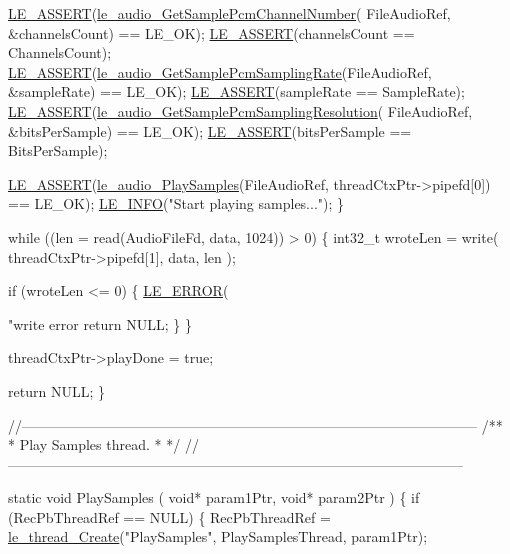 \begin{DoxyCodeInclude}
{{{{{{{{        \hyperlink{le__log_8h_ac0dbbef91dc0fed449d0092ff0557b39}{LE\_ASSERT}(\hyperlink{le__audio__interface_8h_a40bf3633c3050a7526a100562edc97f9}{le\_audio\_GetSamplePcmChannelNumber}(
      FileAudioRef, &channelsCount) == LE\_OK);
        \hyperlink{le__log_8h_ac0dbbef91dc0fed449d0092ff0557b39}{LE\_ASSERT}(channelsCount == ChannelsCount);
        \hyperlink{le__log_8h_ac0dbbef91dc0fed449d0092ff0557b39}{LE\_ASSERT}(\hyperlink{le__audio__interface_8h_a80fb48632ce8f638cea4a3e5d333d66f}{le\_audio\_GetSamplePcmSamplingRate}(FileAudioRef,
       &sampleRate) == LE\_OK);
        \hyperlink{le__log_8h_ac0dbbef91dc0fed449d0092ff0557b39}{LE\_ASSERT}(sampleRate == SampleRate);
        \hyperlink{le__log_8h_ac0dbbef91dc0fed449d0092ff0557b39}{LE\_ASSERT}(\hyperlink{le__audio__interface_8h_a70b9f904ce225aad4fb80b8b24a1f92a}{le\_audio\_GetSamplePcmSamplingResolution}(
      FileAudioRef, &bitsPerSample) == LE\_OK);
        \hyperlink{le__log_8h_ac0dbbef91dc0fed449d0092ff0557b39}{LE\_ASSERT}(bitsPerSample == BitsPerSample);

        \hyperlink{le__log_8h_ac0dbbef91dc0fed449d0092ff0557b39}{LE\_ASSERT}(\hyperlink{le__audio__interface_8h_afd37d59ab8207338da197554f49d7ff0}{le\_audio\_PlaySamples}(FileAudioRef, threadCtxPtr->pipefd[0]) 
      == LE\_OK);
        \hyperlink{le__log_8h_a23e6d206faa64f612045d688cdde5808}{LE\_INFO}(\textcolor{stringliteral}{"Start playing samples..."});
    \}

    \textcolor{keywordflow}{while} ((len = read(AudioFileFd, data, 1024)) > 0)
    \{
        int32\_t wroteLen = write( threadCtxPtr->pipefd[1], data, len );

        \textcolor{keywordflow}{if} (wroteLen <= 0)
        \{
            \hyperlink{le__log_8h_a353590f91b3143a7ba3a416ae5a50c3d}{LE\_ERROR}(\textcolor{stringliteral}{"write error %
            \textcolor{keywordflow}{return} NULL;
        \}
    \}

    threadCtxPtr->playDone = \textcolor{keyword}{true};

    \textcolor{keywordflow}{return} NULL;
\}

\textcolor{comment}{//--------------------------------------------------------------------------------------------------}\textcolor{comment}{}
\textcolor{comment}{/**}
\textcolor{comment}{ *  Play Samples thread.}
\textcolor{comment}{ *}
\textcolor{comment}{ */}
\textcolor{comment}{//--------------------------------------------------------------------------------------------------}

\textcolor{keyword}{static} \textcolor{keywordtype}{void} PlaySamples
(
    \textcolor{keywordtype}{void}* param1Ptr,
    \textcolor{keywordtype}{void}* param2Ptr
)
\{
    \textcolor{keywordflow}{if} (RecPbThreadRef == NULL)
    \{
        RecPbThreadRef = \hyperlink{le__thread_8h_a87e02a46f92e9e3e11ed28a2b265872f}{le\_thread\_Create}(\textcolor{stringliteral}{"PlaySamples"}, PlaySamplesThread, param1Ptr);

}}}}}}}}}
\end{DoxyCodeInclude}
